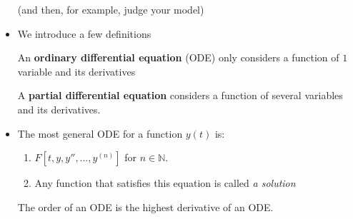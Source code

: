 \begin{itemize}
\begin{idea}
            (and then, for example, judge your model)
          \end{idea}
          \item We introduce a few definitions
          \begin{definition}
              An \textbf{ordinary differential equation} (ODE) only considers a function of $1$ variable and its derivatives
          \end{definition}
          \begin{definition}
              A \textbf{partial differential equation} considers a function of several variables and its derivatives.
          \end{definition}
          \item The most general ODE for a function $y(t)$ is:
          \begin{enumerate}[label=(\alph*)]
              \item $F[t,y,y'',\dots,y^{(n)}]$ for $n\in \mathbb{N}$.
              \item Any function that satisfies this equation is called \textit{a solution} 
          \end{enumerate}
          \begin{definition}
              The order of an ODE is the highest derivative of an ODE.
          \end{definition}
\end{itemize}